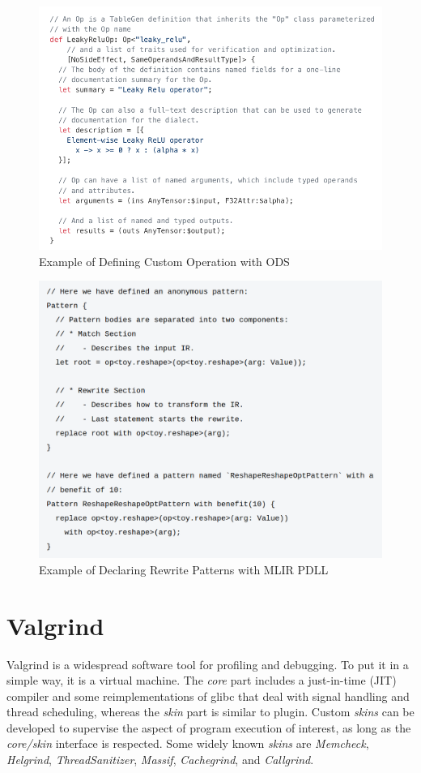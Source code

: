 \begin{figure}
    \centering
    \includegraphics[width=0.8\linewidth]{figures/MLIR_ODS.png}
    \caption{Example of Defining Custom Operation with ODS}
    \label{fig:mlir_ods}
\end{figure}

\begin{figure}
    \centering
    \includegraphics[width=0.6\linewidth]{figures/MLIR_PDLL.png}
    \caption{Example of Declaring Rewrite Patterns with MLIR PDLL}
    \label{fig:mlir_pdll}
\end{figure}

\section{Valgrind}
Valgrind is a widespread software tool for profiling and debugging. To put it in a simple way, it is a virtual machine. The \textit{core} part includes a just-in-time (JIT) compiler and some reimplementations of glibc that deal with signal handling and thread scheduling, whereas the \textit{skin} part is similar to plugin. Custom \textit{skins} can be developed to supervise the aspect of program execution of interest, as long as the \textit{core/skin} interface is respected. Some widely known \textit{skins} are \textit{Memcheck}, \textit{Helgrind}, \textit{ThreadSanitizer}, \textit{Massif}, \textit{Cachegrind}, and \textit{Callgrind}.

